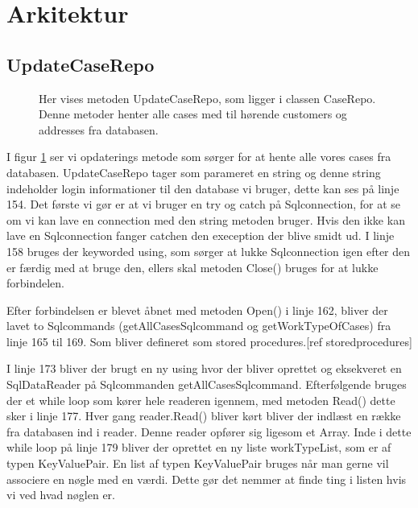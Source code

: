 \section{Arkitektur}

\subsection{UpdateCaseRepo}

\begin{figure}[H]
    \caption{Her vises metoden UpdateCaseRepo, som ligger i classen CaseRepo. Denne metoder henter alle cases med til hørende customers og addresses fra databasen.}
    \label{fig:UpdateCaseRepo}
\end{figure}

I figur \ref{fig:UpdateCaseRepo} ser vi opdaterings metode som sørger for at hente alle vores cases fra databasen. UpdateCaseRepo tager som parameret en string og denne string indeholder login informationer til den database vi bruger, dette kan ses på linje 154.
Det første vi gør er at vi bruger en try og catch på Sqlconnection, for at se om vi kan lave en connection med den string metoden bruger. Hvis den ikke kan lave en Sqlconnection fanger catchen den exeception der blive smidt ud. I linje 158 bruges der keyworded using, som sørger at lukke Sqlconnection igen efter den er færdig med at bruge den, ellers skal metoden Close() bruges for at lukke forbindelen.



Efter forbindelsen er blevet åbnet med metoden Open() i linje 162, bliver der lavet to Sqlcommands (getAllCasesSqlcommand og getWorkTypeOfCases) fra linje 165 til 169. Som bliver defineret som stored procedures.[ref storedprocedures]



I linje 173 bliver der brugt en ny using hvor der bliver oprettet og eksekveret en SqlDataReader på Sqlcommanden getAllCasesSqlcommand. Efterfølgende bruges der et while loop som kører hele readeren igennem, med metoden Read() dette sker i linje 177. Hver gang reader.Read() bliver kørt bliver der indlæst en række fra databasen ind i reader. Denne reader opfører sig ligesom et Array. Inde i dette while loop på linje 179 bliver der oprettet en ny liste workTypeList, som er af typen KeyValuePair. En list af typen KeyValuePair bruges når man gerne vil associere en nøgle med en værdi. Dette gør det nemmer at finde ting i listen hvis vi ved hvad nøglen er.


